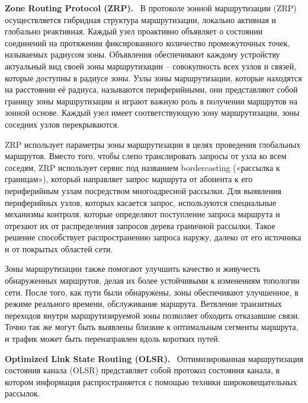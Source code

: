 \documentclass[14pt,a4paper,titlepage]{extarticle}
\renewcommand{\paragraph}[1]{\textbf{#1.}~}
\begin{document}
\paragraph{Zone Routing Protocol (ZRP)}
В протоколе зонной маршрутизации (ZRP) осуществляется гибридная структура маршрутизации, локально активная и глобально реактивная. Каждый узел проактивно объявляет о состоянии соединений на протяжении фиксированного количество промежуточных точек, называемых радиусом зоны. Объявления обеспечивают каждому устройству актуальный вид своей зоны маршрутизации -- совокупность всех узлов и связей, которые доступны в радиусе зоны. Узлы зоны маршрутизации, которые находятся на расстоянии её радиуса, называются периферийными, они  представляют собой границу зоны маршрутизации и играют важную роль в получении маршрутов на зонной основе. Каждый узел имеет соответствующую зону маршрутизации, зоны соседних узлов перекрываются. 

ZRP использует параметры зоны маршрутизации в целях проведения глобальных маршрутов. Вместо того, чтобы слепо транслировать запросы от узла ко всем соседям, ZRP использует сервис под названием bordercasting («рассылка к границам»), который направляет запрос маршрута от абонента к его периферийным узлам посредством многоадресной рассылки. Для выявления периферийных узлов, которых касается запрос, используются специальные механизмы контроля, которые определяют поступление запроса маршрута и отрезают их от распределения запросов дерева граничной рассылки. Такое решение способствует распространению запроса наружу, далеко от его источника и от покрытых областей сети. 

Зоны маршрутизации также помогают улучшить качество и живучесть обнаруженных маршрутов, делая их более устойчивыми к изменениям топологии сети. После того, как пути были обнаружены, зоны обеспечивают улучшенное, в режиме реального времени, обслуживание маршрута. Ветвление транзитных переходов внутри маршрутизируемой зоны позволяет обходить отказавшие связи. Точно так же могут быть выявлены близкие к оптимальным сегменты маршрута, и трафик может быть перенаправлен вдоль коротких путей.

\paragraph{Optimized Link State Routing (OLSR)} Оптимизированная маршрутизация состояния канала (OLSR) представляет собой протокол состояния канала, в котором информация распространяется с помощью техники широковещательных рассылок.
\end{document}
